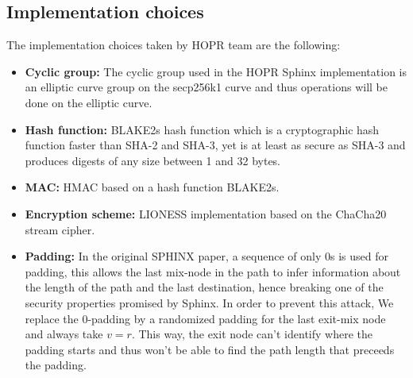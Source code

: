 \subsection*{Implementation choices}
The implementation choices taken by HOPR team are the following:
\begin{itemize}
    \item \textbf{Cyclic group:} The cyclic group used in the HOPR Sphinx implementation is an elliptic curve group on the secp256k1 curve and thus operations will be done on the elliptic curve.
    \item \textbf{Hash function:} BLAKE2s hash function which is a cryptographic hash function faster than SHA-2 and SHA-3, yet is at least as secure as SHA-3 and produces digests of any size between 1 and 32 bytes.
    \item \textbf{MAC:} HMAC based on a hash function BLAKE2s.
    \item \textbf{Encryption scheme:} LIONESS implementation based on the ChaCha20 stream cipher.
    \item \textbf{Padding:} In the original SPHINX paper, a sequence of only 0s is used for padding, this allows the last mix-node in the path to infer information about the length of the path and the last destination, hence breaking one of the security properties promised by Sphinx. In order to prevent this attack, We replace the 0-padding by a randomized padding for the last exit-mix node and always take $v=r$. This way, the exit node can't identify where the padding starts and thus won't be able to find the path length that preceeds the padding.
\end{itemize}





